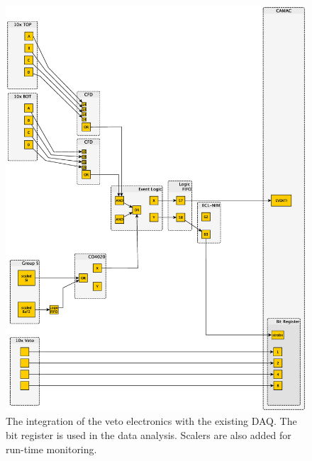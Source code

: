 \begin{figure}[!htbp]
\centering
\includegraphics[width=1.0\textwidth]{figures/electronics_veto.eps}
\caption{The integration of the veto electronics with the existing DAQ.  The bit register is used in the data analysis.  Scalers are also added for run-time monitoring.}
\label{fig:vetoElectronics}
\end{figure}
 

